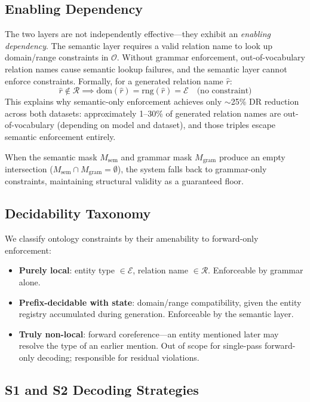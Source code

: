 \documentclass[11pt,a4paper]{article}
\begin{document}
\subsection{Enabling Dependency}
\label{sec:enabling}

The two layers are not independently effective---they exhibit an \emph{enabling dependency}.
The semantic layer requires a valid relation name to look up domain/range constraints in $\mathcal{O}$.
Without grammar enforcement, out-of-vocabulary relation names cause semantic lookup failures, and the semantic layer cannot enforce constraints.
Formally, for a generated relation name $\hat{r}$:
\[
\hat{r} \notin \mathcal{R} \implies \text{dom}(\hat{r}) = \text{rng}(\hat{r}) = \mathcal{E} \quad \text{(no constraint)}
\]
This explains why semantic-only enforcement achieves only $\sim$25\% DR reduction across both datasets: approximately 1--30\% of generated relation names are out-of-vocabulary (depending on model and dataset), and those triples escape semantic enforcement entirely.

When the semantic mask $M_{\text{sem}}$ and grammar mask $M_{\text{gram}}$ produce an empty intersection ($M_{\text{sem}} \cap M_{\text{gram}} = \emptyset$), the system falls back to grammar-only constraints, maintaining structural validity as a guaranteed floor.

\subsection{Decidability Taxonomy}
\label{sec:decidability}

We classify ontology constraints by their amenability to forward-only enforcement:
\begin{itemize}
\item[\textbf{(a)}] \textbf{Purely local}: entity type $\in \mathcal{E}$, relation name $\in \mathcal{R}$. Enforceable by grammar alone.
\item[\textbf{(b)}] \textbf{Prefix-decidable with state}: domain/range compatibility, given the entity registry accumulated during generation. Enforceable by the semantic layer.
\item[\textbf{(c)}] \textbf{Truly non-local}: forward coreference---an entity mentioned later may resolve the type of an earlier mention. Out of scope for single-pass forward-only decoding; responsible for residual violations.
\end{itemize}

\subsection{S1 and S2 Decoding Strategies}
\end{document}
